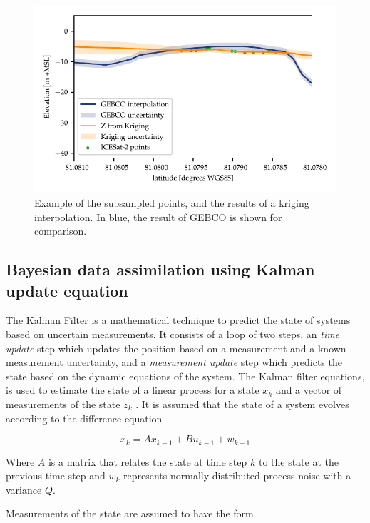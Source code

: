 \begin{figure}[h]
    \centering
    \includegraphics[]{figures/methodology-kriging-output.pdf}
    \caption{Example of the subsampled points, and the results of a kriging interpolation. In blue, the result of GEBCO is shown for comparison.}
    \label{fig:kriging-interpolator}
\end{figure}



\subsection{Bayesian data assimilation using Kalman update equation}
The Kalman Filter is a mathematical technique to predict the state of systems based on uncertain measurements. It consists of a loop of two steps, an \emph{time update} step which updates the position based on a measurement and a known measurement uncertainty, and a \emph{measurement update} step which predicts the state based on the dynamic equations of the system. The Kalman filter equations, is used to estimate the state of a linear process for a state $x_k$ and a vector of measurements of the state $z_k$ \parencite{Welch2021a}.  It is assumed that the state of a system evolves according to the difference equation

\begin{equation}
 x_k = Ax_{k-1} + Bu_{k-1} + w_{k-1}   
\end{equation}

Where $A$ is a matrix that relates the state at time step $k$ to the state at the previous time step and $w_k$ represents normally distributed process noise with a variance $Q$.  

Measurements of the state are assumed to have the form

